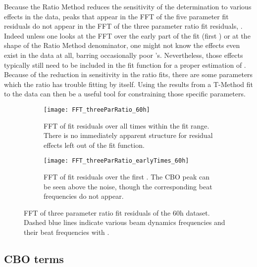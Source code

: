 Because the Ratio Method reduces the sensitivity of the \wa determination to various effects in the data, peaks that appear in the FFT of the five parameter fit residuals do not appear in the FFT of the three parameter ratio fit residuals, . Indeed unless one looks at the FFT over the early part of the fit (first ) or at the shape of the Ratio Method denominator, one might not know the effects even exist in the data at all, barring occasionally poor \chisq's. Nevertheless, those effects typically still need to be included in the fit function for a proper estimation of \wa. Because of the reduction in sensitivity in the ratio fits, there are some parameters which the ratio has trouble fitting by itself. Using the results from a T-Method fit to the data can then be a useful tool for constraining those specific parameters.


\begin{figure}
\centering
    \begin{subfigure}[t]{0.67\textwidth}
        \centering
        \texttt{[image: FFT\_threeParRatio\_60h]}
        \caption{FFT of fit residuals over all times within the fit range. There is no immediately apparent structure for residual effects left out of the fit function.}
    \end{subfigure}%

    \begin{subfigure}[t]{0.67\textwidth}
        \centering
        \texttt{[image: FFT\_threeParRatio\_earlyTimes\_60h]}
        \caption{FFT of fit residuals over the first . The CBO peak can be seen above the noise, though the corresponding beat frequencies do not appear.}
    \end{subfigure}
\caption[FFT of three parameter ratio fit residuals]{FFT of three parameter ratio fit residuals of the 60h dataset. Dashed blue lines indicate various beam dynamics frequencies and their beat frequencies with \wa.}
\label{fig:fft_threeParamRatio}
\end{figure}




\subsection{CBO terms}
\label{sub:cboterms}


